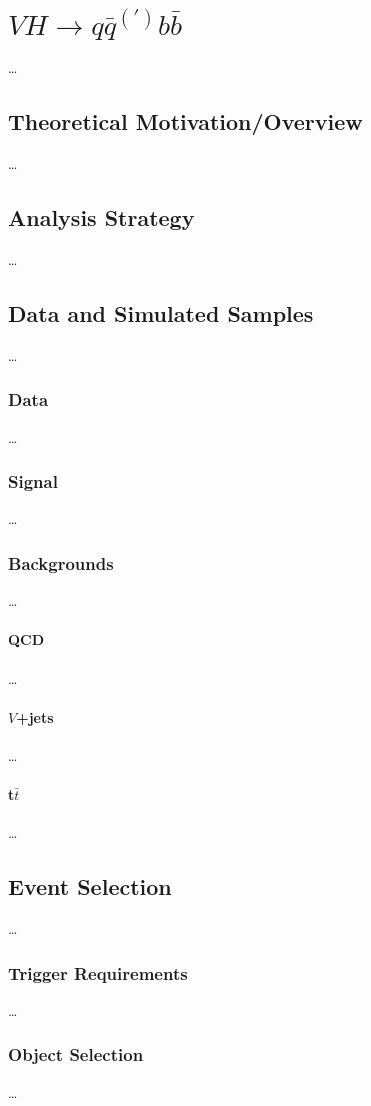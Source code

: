 \graphicspath{{Ch5_VHqqbb/figures/}}

\chapter{$VH \rightarrow q\bar{q}^{(\prime)}b\bar{b}$}
\dots

\section{Theoretical Motivation/Overview}
\dots

\section{Analysis Strategy}
\dots

\section{Data and Simulated Samples}
\dots
\subsection{Data}
\dots
\subsection{Signal}
\dots
\subsection{Backgrounds}
\dots
\subsubsection{QCD}
\dots
\subsubsection{$V$+jets}
\dots
\subsubsection{t$\bar{t}$}
\dots

\section{Event Selection}
\dots
\subsection{Trigger Requirements}
\dots
\subsection{Object Selection}
\dots
